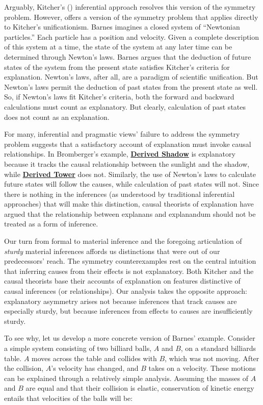 \documentclass[natbib]{svjour3}                     %
\begin{document}
Arguably, Kitcher's (\citeyear{Kitcher1989}) inferential approach resolves this version of the symmetry problem. However, \cite{Barnes1992} offers a version of the symmetry problem that applies directly to Kitcher's unificationism.  Barnes imagines a closed system of ``Newtonian particles.''  Each particle has a position and velocity.  Given a complete description of this system at a time, the state of the system at any later time can be determined through Newton's laws.  Barnes argues that the deduction of future states of the system from the present state satisfies Kitcher's criteria for explanation.  Newton's laws, after all, are a paradigm of scientific unification.  But Newton's laws permit the deduction of past states from the present state as well. So, if Newton's laws fit Kitcher's criteria, both the forward and backward calculations must count as explanatory.  But clearly, calculation of past states does not count as an explanation.

For many, inferential and pragmatic views' failure to address the symmetry problem suggests that a satisfactory account of explanation must invoke causal relationships.  In Bromberger's example, \hyperref[eq:shadow_expl]{\textbf{Derived Shadow}}  is explanatory because it tracks the causal relationship between the sunlight and the shadow, while \hyperref[eq:height_expl]{\textbf{Derived Tower}} does not.  Similarly, the use of Newton's laws to calculate future states will follow the causes, while calculation of past states will not.  Since there is nothing in the inferences (as understood by traditional inferential approaches) that will make this distinction, causal theorists of explanation have argued that the relationship between explanans and explanandum should not be treated as a form of inference.

Our turn from formal to material inference and the foregoing articulation of \textit{sturdy} material inferences affords us distinctions that were out of our predecessors' reach.  The symmetry counterexamples rest on the central intuition that inferring causes from their effects is not explanatory. Both Kitcher and the causal theorists base their accounts of explanation on features distinctive of causal inferences (or relationships).  Our analysis takes the opposite approach: explanatory asymmetry arises not because inferences that track causes are especially sturdy, but because inferences from effects to causes are insufficiently sturdy.  

To see why, let us develop a more concrete version of Barnes' example.  Consider a simple system consisting of two billiard balls, $A$ and $B$, on a standard billiards table.  $A$ moves across the table and collides with $B$, which was not moving.  After the collision, $A$'s velocity has changed, and $B$ takes on a velocity.  These motions can be explained through a relatively simple analysis.  Assuming the masses of $A$ and $B$ are equal and that their collision is elastic, conservation of kinetic energy entails that velocities of the balls will be:  
\end{document}

